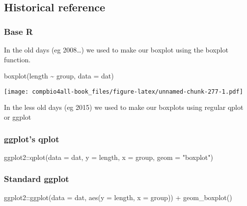 \documentclass[
]{book}
\newenvironment{Shaded}{\begin{snugshade}}{\end{snugshade}}
\newcommand{\AttributeTok}[1]{\textcolor[rgb]{0.77,0.63,0.00}{#1}}
\newcommand{\FunctionTok}[1]{\textcolor[rgb]{0.00,0.00,0.00}{#1}}
\newcommand{\NormalTok}[1]{#1}
\newcommand{\SpecialCharTok}[1]{\textcolor[rgb]{0.00,0.00,0.00}{#1}}
\newcommand{\StringTok}[1]{\textcolor[rgb]{0.31,0.60,0.02}{#1}}
\begin{document}
\hypertarget{historical-reference}{%
\subsection{Historical reference}\label{historical-reference}}

\hypertarget{base-r}{%
\subsubsection{Base R}\label{base-r}}

In the old days (eg 2008\ldots) we used to make our boxplot using the boxplot function.

\begin{Shaded}
\begin{Highlighting}[]
\FunctionTok{boxplot}\NormalTok{(length }\SpecialCharTok{\textasciitilde{}}\NormalTok{ group, }\AttributeTok{data =}\NormalTok{ dat)}
\end{Highlighting}
\end{Shaded}

\texttt{[image: compbio4all-book\_files/figure-latex/unnamed-chunk-277-1.pdf]}

In the less old days (eg 2015) we used to make our boxplots using regular qplot or ggplot

\hypertarget{ggplots-qplot}{%
\subsubsection{ggplot's qplot}\label{ggplots-qplot}}

\begin{Shaded}
\begin{Highlighting}[]
\NormalTok{ggplot2}\SpecialCharTok{::}\FunctionTok{qplot}\NormalTok{(}\AttributeTok{data =}\NormalTok{ dat,}
      \AttributeTok{y =}\NormalTok{ length,}
      \AttributeTok{x =}\NormalTok{ group,}
      \AttributeTok{geom =} \StringTok{"boxplot"}\NormalTok{)}
\end{Highlighting}
\end{Shaded}

\hypertarget{standard-ggplot}{%
\subsubsection{Standard ggplot}\label{standard-ggplot}}

\begin{Shaded}
\begin{Highlighting}[]
\NormalTok{ggplot2}\SpecialCharTok{::}\FunctionTok{ggplot}\NormalTok{(}\AttributeTok{data =}\NormalTok{ dat,}
      \FunctionTok{aes}\NormalTok{(}\AttributeTok{y =}\NormalTok{ length,}
      \AttributeTok{x =}\NormalTok{ group)) }\SpecialCharTok{+}
        \FunctionTok{geom\_boxplot}\NormalTok{()}
\end{Highlighting}
\end{Shaded}
\end{document}
